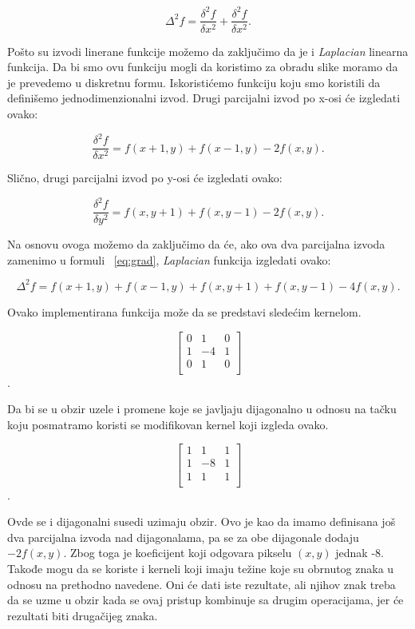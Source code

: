 \documentclass[a4paper,12pt,titlepage]{article}
\begin{document}
\begin{equation}\label{eq:grad}
\Delta^{2}f = \dfrac{\delta^{2}f}{\delta x^{2}} + \dfrac{\delta^{2}f}{\delta x^{2}}. 
\end{equation}

Pošto su izvodi linerane funkcije možemo da zaključimo da je i \emph{Laplacian} linearna funkcija. Da bi smo ovu funkciju mogli da koristimo za obradu slike moramo da je prevedemo u diskretnu formu. Iskoristićemo funkciju koju smo koristili da definišemo jednodimenzionalni izvod. Drugi parcijalni izvod po x-osi će izgledati ovako:

\begin{equation}\label{eq:grad2}
\dfrac{\delta^{2}f}{\delta x^{2}} = f(x + 1, y) + f(x - 1, y) - 2f(x, y).
\end{equation}

Slično, drugi parcijalni izvod po y-osi će izgledati ovako:

\begin{equation}\label{eq:grad3}
\dfrac{\delta^{2}f}{\delta y^{2}} = f(x, y + 1) + f(x, y - 1) - 2f(x, y).
\end{equation}

Na osnovu ovoga možemo da zaključimo da će, ako ova dva parcijalna izvoda zamenimo u formuli ~\ref{eq:grad}, \emph{Laplacian} funkcija izgledati ovako:

\begin{equation}\label{eq:grad4}
\Delta^{2}f = f(x + 1, y) + f(x - 1, y) + f(x, y + 1) + f(x, y - 1) - 4f(x, y). 
\end{equation}

Ovako implementirana funkcija može da se predstavi sledećim kernelom.

\[
\begin{bmatrix}
0 & 1 & 0 \\
1 & -4 & 1 \\
0 & 1 & 0 \\
\end{bmatrix}
\]. 

Da bi se u obzir uzele i promene koje se javljaju dijagonalno u odnosu na tačku koju posmatramo koristi se modifikovan kernel koji izgleda ovako.

\[
\begin{bmatrix}
1 & 1 & 1 \\
1 & -8 & 1 \\
1 & 1 & 1 \\
\end{bmatrix}
\].

Ovde se i dijagonalni susedi uzimaju obzir. Ovo je kao da imamo definisana još dva parcijalna izvoda nad dijagonalama, pa se za obe dijagonale dodaju $-2f(x, y)$. Zbog toga je koeficijent koji odgovara pikselu $(x, y)$ jednak -8. Takođe mogu da se koriste i kerneli koji imaju težine koje su obrnutog znaka u odnosu na prethodno navedene. Oni će dati iste rezultate, ali njihov znak treba da se uzme u obzir kada se ovaj pristup kombinuje sa drugim operacijama, jer će rezultati biti drugačijeg znaka.
\end{document}
